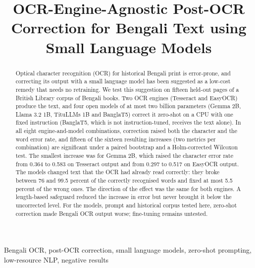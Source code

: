 \documentclass[conference]{IEEEtran}
\begin{document}
\title{OCR-Engine-Agnostic Post-OCR Correction for Bengali Text using Small Language Models}

\author{
}

\maketitle

\begin{abstract}
Optical character recognition (OCR) for historical Bengali print is error-prone, and correcting its output with a small language model has been suggested as a low-cost remedy that needs no retraining. We test this suggestion on fifteen held-out pages of a British Library corpus of Bengali books. Two OCR engines (Tesseract and EasyOCR) produce the text, and four open models of at most two billion parameters (Gemma 2B, Llama 3.2 1B, TituLLMs 1B and BanglaT5) correct it zero-shot on a CPU with one fixed instruction (BanglaT5, which is not instruction-tuned, receives the text alone). In all eight engine-and-model combinations, correction raised both the character and the word error rate, and fifteen of the sixteen resulting increases (two metrics per combination) are significant under a paired bootstrap and a Holm-corrected Wilcoxon test. The smallest increase was for Gemma 2B, which raised the character error rate from 0.364 to 0.583 on Tesseract output and from 0.297 to 0.517 on EasyOCR output. The models changed text that the OCR had already read correctly: they broke between 76 and 99.5 percent of the correctly recognised words and fixed at most 5.5 percent of the wrong ones. The direction of the effect was the same for both engines. A length-based safeguard reduced the increase in error but never brought it below the uncorrected level. For the models, prompt and historical corpus tested here, zero-shot correction made Bengali OCR output worse; fine-tuning remains untested.
\end{abstract}

\begin{IEEEkeywords}
Bengali OCR, post-OCR correction, small language models, zero-shot prompting, low-resource NLP, negative results
\end{IEEEkeywords}
\end{document}
